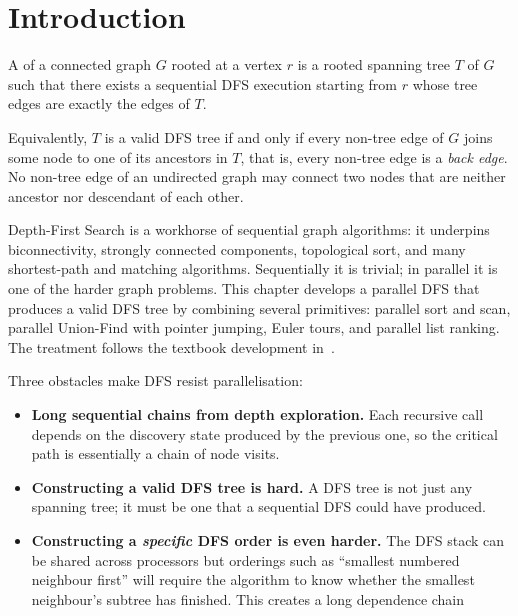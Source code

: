 \section{Introduction}
\begin{ppdefn}
A  of a connected graph $G$ rooted at a vertex
$r$ is a rooted spanning tree $T$ of $G$ such that there exists a
sequential DFS execution starting from $r$ whose tree edges are exactly
the edges of $T$.
 
Equivalently, $T$ is a valid DFS tree if and only if every non-tree
edge of $G$ joins some node to one of its ancestors in $T$, that
is, every non-tree edge is a \emph{back edge}.  No non-tree edge of an
undirected graph may connect two nodes that are neither ancestor nor
descendant of each other.
\end{ppdefn}
Depth-First Search is a workhorse of sequential graph algorithms: it
underpins biconnectivity, strongly connected components, topological
sort, and many shortest-path and matching algorithms.
Sequentially it is trivial; in parallel it is one of the harder
graph problems.
This chapter develops a parallel DFS that produces a valid DFS tree by
combining several primitives: parallel sort and
scan, parallel Union-Find with pointer jumping, Euler tours, and
parallel list ranking.  The treatment follows the textbook development
in~\cite{grama2003,kumar1994}.

Three obstacles make DFS resist parallelisation:
\begin{itemize}
  \item \textbf{Long sequential chains from depth exploration.}
        Each recursive call depends on the discovery state produced by
        the previous one, so the critical path is essentially a chain
        of node visits.
  \item \textbf{Constructing a valid DFS tree is hard.}
        A DFS tree is not just any spanning tree; it must be one that a
        sequential DFS could have produced.
  \item \textbf{Constructing a \emph{specific} DFS order is even harder.}
        The DFS stack can be shared across processors but orderings such as ``smallest numbered neighbour first'' will require the algorithm to know whether the smallest neighbour's subtree has finished. This creates a long dependence chain
\end{itemize}

